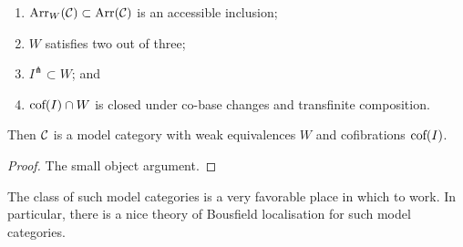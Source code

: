\documentclass[11pt]{article}
\begin{document}
\begin{JeremyModelCategories}
\begin{thm*}
\begin{enumerate}\squishlist
\item $\textup{Arr}_W(\mathcal{C})\subset\textup{Arr}(\mathcal{C})$ is an accessible inclusion;
\item $W$ satisfies two out of three;
\item $I^\pitchfork\subset W$; and
\item $\textup{cof}(I)\cap W$ is closed under co-base changes and transfinite composition.
\end{enumerate}
Then $\mathcal{C}$ is a model category with weak equivalences $W$ and cofibrations $\textup{cof}(I)$.
\end{thm*}
\begin{proof}
The small object argument.
\end{proof}
\noindent The class of such model categories is a very favorable place in which to work. In particular, there is a nice theory of Bousfield localisation for such model categories.
\pagebreak
\end{JeremyModelCategories}
\end{document}
